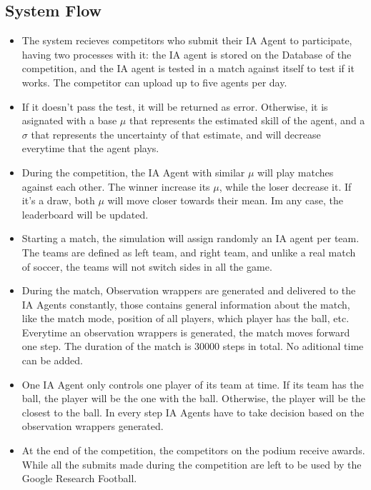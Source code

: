 \subsection*{System Flow}
\begin{itemize}
\item The system recieves competitors who submit their IA Agent to participate, having two processes with it: the IA agent is stored on the Database of the competition, and the IA agent is tested in a match against itself to test if it works. The competitor can upload up to five agents per day.

\item If it doesn't pass the test, it will be returned as error. Otherwise, it is asignated with a base $\mu$ that represents the estimated skill of the agent, and a $\sigma$ that represents the uncertainty of that estimate, and will decrease everytime that the agent plays.

\item During the competition, the IA Agent with similar $\mu$ will play matches against each other. The winner increase its $\mu$, while the loser decrease it. If it's a draw, both $\mu$ will move closer towards their mean. Im any case, the leaderboard will be updated.

\item Starting a match, the simulation will assign randomly an IA agent per team. The teams are defined as left team, and right team, and unlike a real match of soccer, the teams will not switch sides in all the game.

\item During the match, Observation wrappers are generated and delivered to the IA Agents constantly, those contains general information about the match, like the match mode, position of all players, which player has the ball, etc. Everytime an observation wrappers is generated, the match moves forward one step. The duration of the match is 30000 steps in total. No aditional time can be added.

\item One IA Agent only controls one player of its team at time. If its team has the ball, the player will be the one with the ball. Otherwise, the player will be the closest to the ball. In every step IA Agents have to take decision based on the observation wrappers generated.

\item At the end of the competition, the competitors on the podium receive awards. While all the submits made during the competition are left to be used by the Google Research Football.
\end{itemize}
